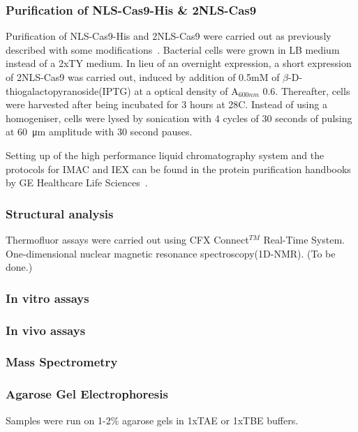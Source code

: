 \documentclass[11pt]{article}
\begin{document}
\subsubsection{Purification of NLS-Cas9-His \& 2NLS-Cas9}
Purification of NLS-Cas9-His and 2NLS-Cas9 were carried out as previously described with some modifications~\citep{Jinek2012a}. Bacterial cells were grown in LB medium instead of a 2xTY medium. In lieu of an overnight expression, a short expression of 2NLS-Cas9 was carried out, induced by addition of 0.5mM of $\beta$-D-thiogalactopyranoside(IPTG) at a optical density of A$_{600nm}$ 0.6. Thereafter, cells were harvested after being incubated for 3 hours at 28\degree C. Instead of using a homogeniser, cells were lysed by sonication with 4 cycles of 30 seconds of pulsing at \SI{60}{\micro\metre} amplitude with 30 second pauses.

Setting up of the high performance liquid chromatography system and the protocols for IMAC and IEX can be found in the protein purification handbooks by GE Healthcare Life Sciences~\citep{GE2016}.

\subsubsection{Structural analysis}
Thermofluor assays were carried out using CFX Connect$^{TM}$ Real-Time System.
One-dimensional nuclear magnetic resonance spectroscopy(1D-NMR). (To be done.)

\subsubsection{In vitro assays}

\subsubsection{In vivo assays}

\subsubsection{Mass Spectrometry}


\subsubsection{Agarose Gel Electrophoresis}
Samples were run on 1-2\% agarose gels in 1xTAE or 1xTBE buffers.
\end{document}
